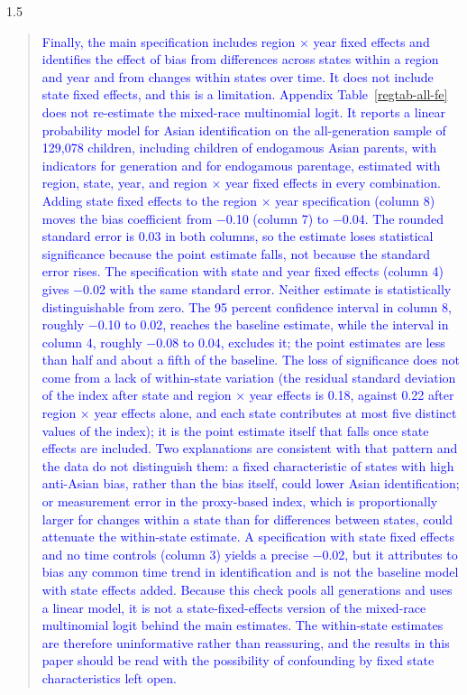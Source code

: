 \documentclass[12pt,english]{article}
\newcommand{\rrxspc}{1.5}
\begin{document}
\begin{refsection}
\begin{spacing}{\rrxspc}
        \begin{quote}\textcolor{blue}{Finally, the main specification includes region $\times$ year fixed effects and identifies the effect of bias from differences across states within a region and year and from changes within states over time. It does not include state fixed effects, and this is a limitation. Appendix Table~\ref{regtab-all-fe} does not re-estimate the mixed-race multinomial logit. It reports a linear probability model for Asian identification on the all-generation sample of 129{,}078 children, including children of endogamous Asian parents, with indicators for generation and for endogamous parentage, estimated with region, state, year, and region $\times$ year fixed effects in every combination. Adding state fixed effects to the region $\times$ year specification (column 8) moves the bias coefficient from $-$0.10 (column 7) to $-$0.04. The rounded standard error is 0.03 in both columns, so the estimate loses statistical significance because the point estimate falls, not because the standard error rises. The specification with state and year fixed effects (column 4) gives $-$0.02 with the same standard error. Neither estimate is statistically distinguishable from zero. The 95 percent confidence interval in column 8, roughly $-$0.10 to 0.02, reaches the baseline estimate, while the interval in column 4, roughly $-$0.08 to 0.04, excludes it; the point estimates are less than half and about a fifth of the baseline. The loss of significance does not come from a lack of within-state variation (the residual standard deviation of the index after state and region $\times$ year effects is 0.18, against 0.22 after region $\times$ year effects alone, and each state contributes at most five distinct values of the index); it is the point estimate itself that falls once state effects are included. Two explanations are consistent with that pattern and the data do not distinguish them: a fixed characteristic of states with high anti-Asian bias, rather than the bias itself, could lower Asian identification; or measurement error in the proxy-based index, which is proportionally larger for changes within a state than for differences between states, could attenuate the within-state estimate. A specification with state fixed effects and no time controls (column 3) yields a precise $-$0.02, but it attributes to bias any common time trend in identification and is not the baseline model with state effects added. Because this check pools all generations and uses a linear model, it is not a state-fixed-effects version of the mixed-race multinomial logit behind the main estimates. The within-state estimates are therefore uninformative rather than reassuring, and the results in this paper should be read with the possibility of confounding by fixed state characteristics left open.}\end{quote}

\end{spacing}
\end{refsection}
\end{document}
